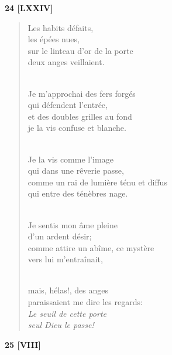 \documentclass[a4paper,11pt]{book}
\begin{document}
\bigskip

\begin{center} {\bf 24 [LXXIV]} \end{center}

\begin{verse}
Les habits défaits, \\
les épées nues, \\
sur le linteau d'or de la porte \\
deux anges veillaient. \\ \

Je m'approchai des fers forgés \\
qui défendent l'entrée, \\
et des doubles grilles au fond \\
je la vis confuse et blanche. \\ \

Je la vis comme l'image \\
qui dans une rêverie passe, \\
comme un rai de lumière ténu et diffus \\
qui entre des ténèbres nage. \\ \

Je sentis mon âme pleine \\
d'un ardent désir; \\
comme attire un abîme, ce mystère \\
vers lui m'entraînait, \\ \

mais, hélas!, des anges \\
paraissaient me dire les regards: \\
{\em Le seuil de cette porte \\
seul Dieu le passe!} \\
\end{verse}

\bigskip

\begin{center} {\bf 25 [VIII]} \end{center}
\end{document}
